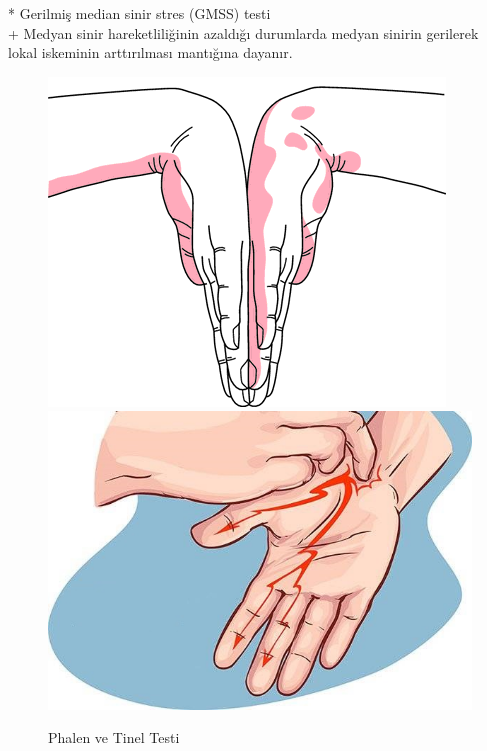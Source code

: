 \documentclass[12pt,twoside]{deuthesis}
\begin{document}
* Gerilmiş median sinir stres (GMSS) testi\\
+ Medyan sinir hareketliliğinin azaldığı durumlarda medyan sinirin gerilerek lokal iskeminin arttırılması mantığına dayanır.
\begin{figure}

{\centering \includegraphics[width=0.49\linewidth,height=0.18\textheight]{figure/phalen} \includegraphics[width=0.49\linewidth,height=0.18\textheight]{figure/tinel} 

}

\caption{Phalen ve Tinel Testi}\label{fig:unnamed-chunk-3}
\end{figure}
\end{document}
